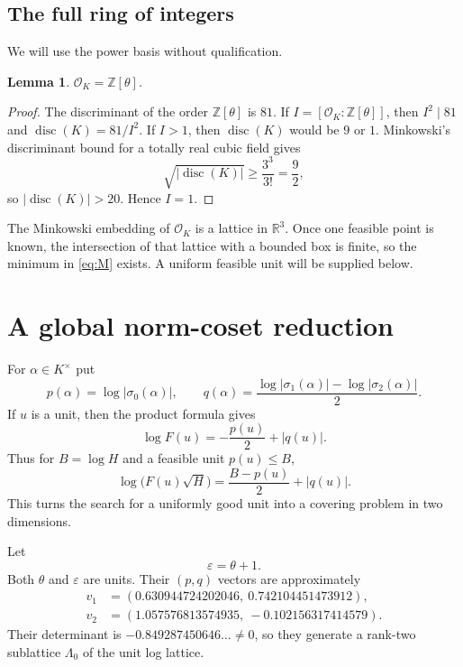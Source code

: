 \documentclass[11pt]{article}
\newtheorem{lemma}[theorem]{Lemma}
\theoremstyle{definition}
\newcommand{\Z}{\mathbb Z}
\newcommand{\R}{\mathbb R}
\newcommand{\OK}{\mathcal O_K}
\DeclareMathOperator{\disc}{disc}
\begin{document}
\subsection{The full ring of integers}
We will use the power basis without qualification.

\begin{lemma}\label{lem:ring}
$\OK=\Z[\theta]$.
\end{lemma}
\begin{proof}
The discriminant of the order $\Z[\theta]$ is $81$.  If
$I=[\OK:\Z[\theta]]$, then $I^2\mid81$ and
$\disc(K)=81/I^2$.  If $I>1$, then $\disc(K)$ would be $9$ or $1$.
Minkowski's discriminant bound for a totally real cubic field gives
\[
\sqrt{|\disc(K)|}\ge \frac{3^3}{3!}=\frac92,
\]
so $|\disc(K)|>20$.  Hence $I=1$.
\end{proof}

The Minkowski embedding of $\OK$ is a lattice in $\R^3$.  Once one feasible point is known, the intersection of that lattice with a bounded box is finite, so the minimum in \eqref{eq:M} exists.  A uniform feasible unit will be supplied below.

\section{A global norm-coset reduction}
For $\alpha\in K^\times$ put
\[
p(\alpha)=\log|\sigma_0(\alpha)|,
\qquad
q(\alpha)=\frac{\log|\sigma_1(\alpha)|-\log|\sigma_2(\alpha)|}{2}.
\]
If $u$ is a unit, then the product formula gives
\begin{equation}\label{eq:unit-objective}
\log F(u)=-\frac{p(u)}2+|q(u)|.
\end{equation}
Thus for $B=\log H$ and a feasible unit $p(u)\le B$,
\begin{equation}\label{eq:gauge}
\log\bigl(F(u)\sqrt H\bigr)
=\frac{B-p(u)}2+|q(u)|.
\end{equation}
This turns the search for a uniformly good unit into a covering problem in two dimensions.

Let
\[
\varepsilon=\theta+1.
\]
Both $\theta$ and $\varepsilon$ are units.  Their $(p,q)$ vectors are approximately
\[
\begin{aligned}
v_1&=(0.630944724202046,\ 0.742104451473912),\\
v_2&=(1.057576813574935,\ -0.102156317414579).
\end{aligned}
\]
Their determinant is $-0.849287450646\ldots\ne0$, so they generate a rank-two sublattice $\Lambda_0$ of the unit log lattice.
\end{document}
